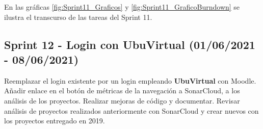 En las gráficas \ref{fig:Sprint11_Graficos} y \ref{fig:Sprint11_GraficoBurndown} se ilustra el transcurso de las tareas del Sprint 11.



\subsection{Sprint 12 - Login con UbuVirtual (01/06/2021 - 08/06/2021)}
Reemplazar el login existente por un login empleando \textbf{UbuVirtual} con Moodle. Añadir enlace en el botón de métricas de la navegación a SonarCloud, a los análisis de los proyectos. Realizar mejoras de código y documentar. Revisar análisis de proyectos realizados anteriormente con SonarCloud y crear nuevos con los proyectos entregado en 2019.

